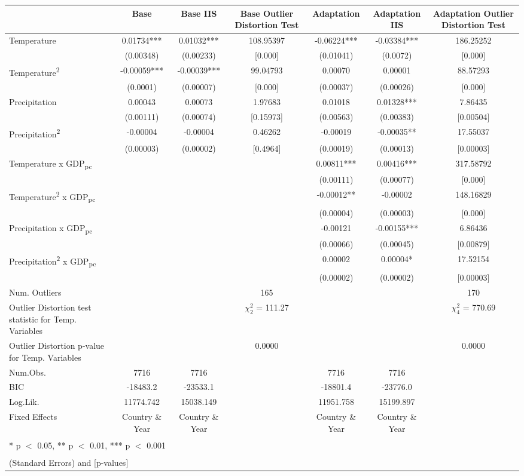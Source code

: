 \documentclass[a3, landscape]{sciposter}
\begin{document}
\begin{table}
\centering
\begin{tabular}[t]{lcc|>{}c|cc|>{}c|}
\toprule
  & Base & Base IIS & Base Outlier Distortion Test & Adaptation & Adaptation IIS & Adaptation Outlier Distortion Test\\
\midrule
Temperature & 0.01734*** & 0.01032*** & 108.95397 & -0.06224*** & -0.03384*** & 186.25252\\
 & (0.00348) & (0.00233) & [0.000] & (0.01041) & (0.0072) & [0.000]\\
Temperature\textsuperscript{2} & -0.00059*** & -0.00039*** & 99.04793 & 0.00070 & 0.00001 & 88.57293\\
 & (0.0001) & (0.00007) & [0.000] & (0.00037) & (0.00026) & [0.000]\\
Precipitation & 0.00043 & 0.00073 & 1.97683 & 0.01018 & 0.01328*** & 7.86435\\
 & (0.00111) & (0.00074) & [0.15973] & (0.00563) & (0.00383) & [0.00504]\\
Precipitation\textsuperscript{2} & -0.00004 & -0.00004 & 0.46262 & -0.00019 & -0.00035** & 17.55037\\
 & (0.00003) & (0.00002) & [0.4964] & (0.00019) & (0.00013) & [0.00003]\\
Temperature x GDP\textsubscript{pc} &  &  &  & 0.00811*** & 0.00416*** & 317.58792\\
 &  &  &  & (0.00111) & (0.00077) & [0.000]\\
Temperature\textsuperscript{2} x GDP\textsubscript{pc} &  &  &  & -0.00012** & -0.00002 & 148.16829\\
 &  &  &  & (0.00004) & (0.00003) & [0.000]\\
Precipitation x GDP\textsubscript{pc} &  &  &  & -0.00121 & -0.00155*** & 6.86436\\
 &  &  &  & (0.00066) & (0.00045) & [0.00879]\\
Precipitation\textsuperscript{2} x GDP\textsubscript{pc} &  &  &  & 0.00002 & 0.00004* & 17.52154\\
 &  &  &  & (0.00002) & (0.00002) & [0.00003]\\
\midrule
Num. Outliers &  &  & 165 &  &  & 170\\
Outlier Distortion test statistic for Temp. Variables &  &  & $\chi^2_{2}$ = 111.27 &  &  & $\chi^2_{4}$ = 770.69\\
Outlier Distortion p-value for Temp. Variables &  &  & 0.0000 &  &  & 0.0000\\
Num.Obs. & 7716 & 7716 &  & 7716 & 7716 & \\
BIC & -18483.2 & -23533.1 &  & -18801.4 & -23776.0 & \\
Log.Lik. & 11774.742 & 15038.149 &  & 11951.758 & 15199.897 & \\
Fixed Effects & Country \& Year & Country \& Year &  & Country \& Year & Country \& Year & \\
\bottomrule
\multicolumn{7}{l}{\textsuperscript{} * p $<$ 0.05, ** p $<$ 0.01, *** p $<$ 0.001}\\
\multicolumn{7}{l}{\textsuperscript{} (Standard Errors) and [p-values]}\\
\end{tabular}
\end{table}
\end{document}

